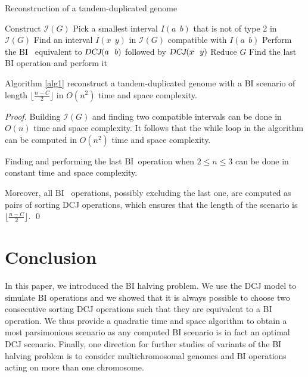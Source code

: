 \documentclass{llncs}
\def\BI{\ensuremath{\mbox{BI}}}
\def\DCJ{\ensuremath{\mbox{\sl DCJ}}}
\begin{document}
\begin{algorithm}                      \caption{Reconstruction of a tandem-duplicated genome}          \label{alg1}                           \begin{algorithmic}[1]                    
\STATE Construct $\mathcal{I}(G)$
\STATE Pick a smallest interval $I(a ~~ b)$ that is not of type 2 in $\mathcal{I}(G)$
\STATE Find an interval $I(x ~~ y)$ in $\mathcal{I}(G)$ compatible with $I(a ~~ b)$
\STATE Perform the \BI ~ equivalent to $\DCJ(a ~~ b)$ followed by $\DCJ(x ~~ y)$
\STATE Reduce $G$
\ENDWHILE
{}
\STATE Find the last BI operation and perform it
\ENDIF
\end{algorithmic}
\end{algorithm}



\begin{theorem}

Algorithm \ref{alg1} reconstruct a tandem-duplicated genome with a BI scenario of length $\lfloor \frac{n - C}{2} \rfloor$ in $O(n^2)$ time and space complexity.
\end{theorem}

\begin{proof}
Building $\mathcal{I}(G)$ and finding two compatible intervals can be done in $O(n)$ time and space complexity. It follows that the while loop in the algorithm can be computed in $O(n^2)$ time and space complexity.



Finding and performing the last \BI~operation when  $2\leq n\leq 3$ can be done in constant time and space complexity.

Moreover, all \BI~ operations, possibly excluding the last one, are computed as 
pairs of sorting DCJ operations, which ensures that the length of the scenario 
is $\lfloor \frac{n - C}{2} \rfloor$. \qed
\end{proof}


\section{Conclusion}

In this paper, we introduced the BI halving problem. We use the DCJ model
to simulate BI operations and we showed that it is always possible to choose two consecutive 
sorting DCJ operations such that they are equivalent to a BI operation.
We thus provide a quadratic time and space algorithm to obtain a
most parsimonious scenario as any computed BI scenario is in fact an optimal DCJ scenario.
Finally, one direction for further studies of variants of the BI halving problem is to consider multichromosomal
genomes and BI operations acting on more than one chromosome.
 

\end{document}
